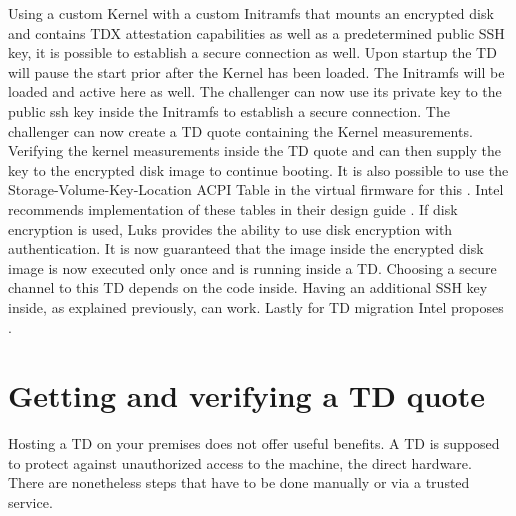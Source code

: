 Using a custom Kernel with a custom Initramfs that mounts an encrypted disk and contains TDX attestation capabilities as well as a predetermined public SSH key, it is possible to establish a secure connection as well. Upon startup the TD will pause the start prior after the Kernel has been loaded. The Initramfs will be loaded and active here as well. The challenger can now use its private key to the public ssh key inside the Initramfs to establish a secure connection. The challenger can now create a TD quote containing the Kernel measurements. Verifying the kernel measurements inside the TD quote and can then supply the key to the encrypted disk image to continue booting. It is also possible to use the Storage-Volume-Key-Location ACPI Table in the virtual firmware for this \cite{uefi_forum_inc_acpi_docu_2022}. Intel recommends implementation of these tables in their design guide \cite{TDVF_design_guide}. If disk encryption is used, Luks provides the ability to use disk encryption with authentication. It is now guaranteed that the image inside the encrypted disk image is now executed only once and is running inside a TD. Choosing a secure channel to this TD depends on the code inside. Having an additional SSH key inside, as explained previously, can work.
Lastly for TD migration Intel proposes \cite{td Migration}.

\section{Getting and verifying a TD quote}

Hosting a TD on your premises does not offer useful benefits. A TD is supposed to protect against unauthorized access to the machine, the direct hardware. There are nonetheless steps that have to be done manually or via a trusted service. 

